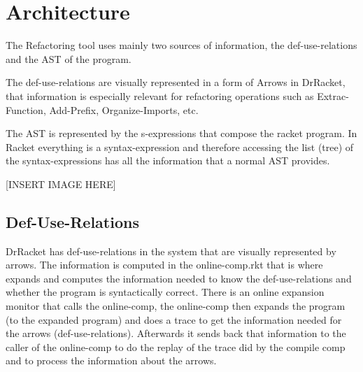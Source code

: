 
\section{Architecture}
The Refactoring tool uses mainly two sources of information, the def-use-relations and
the AST of the program.

The def-use-relations are visually represented in a form of Arrows in DrRacket,
that information is especially relevant for refactoring operations such as Extrac-Function,
Add-Prefix, Organize-Imports, etc.

The AST is represented by the s-expressions that compose the racket program. In
Racket everything is a syntax-expression and therefore accessing the list (tree)
of the syntax-expressions has all the information that a normal AST provides.


[INSERT IMAGE HERE]


\subsection{Def-Use-Relations}
DrRacket has def-use-relations in the system that are visually represented by
arrows. The information is computed in the online-comp.rkt that is where expands
and computes the information needed to know the def-use-relations and whether
the program is syntactically correct.
There is an online expansion monitor that calls the online-comp, the online-comp
then expands the program (to the expanded program) and does a trace to get the
information needed for the arrows (def-use-relations).
Afterwards it sends back that information to the caller of the online-comp to do
the replay of the trace did by the compile comp and to process the information
about the arrows.


